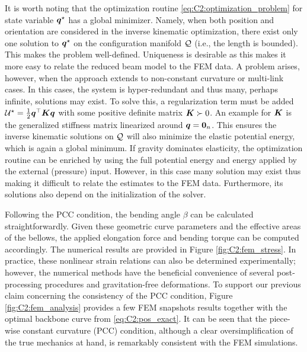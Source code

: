 \begin{rmk} 
 It is worth noting that the optimization routine \eqref{eq:C2:optimization_problem} for state variable ${\boldsymbol{q}}^\star$ has a global minimizer. Namely, when both position and orientation are considered in the inverse kinematic optimization, there exist only one solution to ${\boldsymbol{q}}^\star$ on the configuration manifold $\mathcal{Q}$ (i.e., the length is bounded). This makes the problem well-defined. Uniqueness is desirable as this makes it more easy to relate the reduced beam model to the FEM data. A problem arises, however, when the approach extends to non-constant curvature or multi-link cases. In this cases, the system is hyper-redundant and thus many, perhaps infinite, solutions may exist. To solve this, a regularization term must be added $\mathcal{U}^\star = \tfrac{1}{2} {\boldsymbol{q}}^\top\boldsymbol{K}{\boldsymbol{q}}$ with some positive definite matrix $\boldsymbol{K} \succ 0 $. An example for $\boldsymbol{K}$ is the generalized stiffness matrix linearized around ${\boldsymbol{q}} = \boldsymbol{0}_n$. This ensures the inverse kinematic solutions on $\mathcal{Q}$ will also minimize the elastic potential energy, which is again a global minimum. If gravity dominates elasticity, the optimization routine can be enriched by using the full potential energy and energy applied by the external (pressure) input. However, in this case many solution may exist thus making it difficult to relate the estimates to the FEM data. Furthermore, its solutions also depend on the initialization of the solver. 
  
\end{rmk}

Following the PCC condition, the bending angle $\beta$ can be calculated straightforwardly. Given these geometric curve parameters and the effective areas of the bellows, the applied elongation force and bending torque can be computed accordingly. The numerical results are provided in Figure \ref{fig:C2:fem_stress}. In practice, these nonlinear strain relations can also be determined experimentally; however, the numerical methods have the beneficial convenience of several post-processing procedures and gravitation-free deformations. To support our previous claim concerning the consistency of the PCC condition, Figure \ref{fig:C2:fem_analysis} provides a few FEM snapshots results together with the optimal backbone curve from \eqref{eq:C2:pos_exact}. It can be seen that the piece-wise constant curvature (PCC) condition, although a clear oversimplification of the true mechanics at hand, is remarkably consistent with the FEM simulations.

